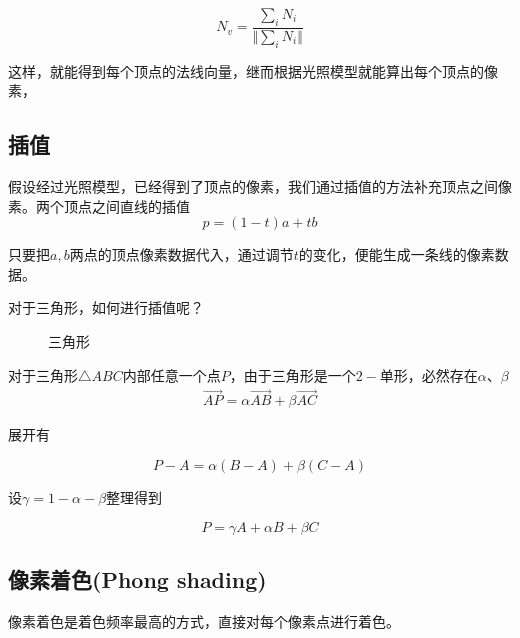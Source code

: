 \begin{equation}
    N_v=\frac{\sum_iN_i}{\Vert\sum_iN_i\Vert}
\end{equation}

这样，就能得到每个顶点的法线向量，继而根据光照模型就能算出每个顶点的像素，

\subsection*{插值}

假设经过光照模型，已经得到了顶点的像素，我们通过插值的方法补充顶点之间像素。两个顶点之间直线的插值
\begin{equation}
    p=(1-t)a+tb
\end{equation}

只要把$a,b$两点的顶点像素数据代入，通过调节$t$的变化，便能生成一条线的像素数据。

对于三角形，如何进行插值呢？

\begin{figure}[H]
    \centering
    \caption[short]{三角形}
\end{figure}

对于三角形$\triangle ABC$内部任意一个点$P$，由于三角形是一个$2-$单形，必然存在$\alpha$、$\beta$
\begin{eqnarray}
    \overrightarrow{AP}=\alpha \overrightarrow{AB}+\beta \overrightarrow{AC}
\end{eqnarray}

展开有

\begin{equation}
    P-A=\alpha(B-A)+\beta(C-A)
\end{equation}

设$\gamma=1-\alpha-\beta$整理得到

\begin{equation}
    P=\gamma A+\alpha B+\beta C
\end{equation}

\subsection*{像素着色(Phong shading)}

像素着色是着色频率最高的方式，直接对每个像素点进行着色。

